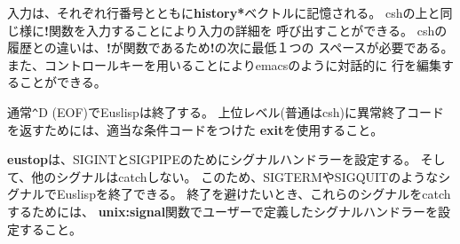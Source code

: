 入力は、それぞれ行番号とともに{\bf *history*}ベクトルに記憶される。
cshの上と同じ様に{\bf !}関数を入力することにより入力の詳細を
呼び出すことができる。
cshの履歴との違いは、{\bf !}が関数であるため{\bf !}の次に最低１つの
スペースが必要である。
また、コントロールキーを用いることによりemacsのように対話的に
行を編集することができる。

通常\verb+^+D (EOF)でEuslispは終了する。
上位レベル(普通はcsh)に異常終了コードを返すためには、適当な条件コードをつけた
{\bf exit}を使用すること。

{\bf eustop}は、SIGINTとSIGPIPEのためにシグナルハンドラーを設定する。
そして、他のシグナルはcatchしない。
このため、SIGTERMやSIGQUITのようなシグナルでEuslispを終了できる。
終了を避けたいとき、これらのシグナルをcatchするためには、
{\bf unix:signal}関数でユーザーで定義したシグナルハンドラーを設定すること。

